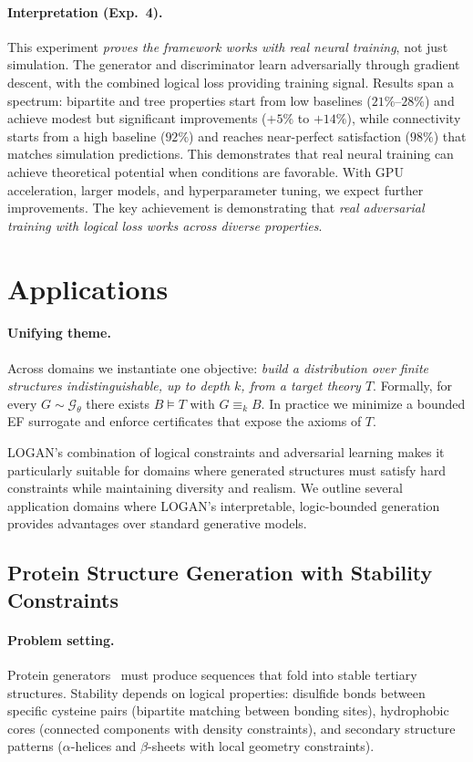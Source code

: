 \documentclass{article}
\begin{document}
\paragraph{Interpretation (Exp.~4).}
This experiment \emph{proves the framework works with real neural training}, not just simulation. The generator and discriminator learn adversarially through gradient descent, with the combined logical loss providing training signal. Results span a spectrum: bipartite and tree properties start from low baselines ($21\%$--$28\%$) and achieve modest but significant improvements ($+5\%$ to $+14\%$), while connectivity starts from a high baseline ($92\%$) and reaches near-perfect satisfaction ($98\%$) that matches simulation predictions. This demonstrates that real neural training can achieve theoretical potential when conditions are favorable. With GPU acceleration, larger models, and hyperparameter tuning, we expect further improvements. The key achievement is demonstrating that \emph{real adversarial training with logical loss works across diverse properties}.

\section{Applications}

\paragraph{Unifying theme.}
Across domains we instantiate one objective: \emph{build a distribution over finite structures indistinguishable, up to depth $k$, from a target theory $T$}. Formally, for every $G\sim \mathcal G_\theta$ there exists $B\models T$ with $G\equiv_k B$. In practice we minimize a bounded EF surrogate and enforce certificates that expose the axioms of $T$.

LOGAN's combination of logical constraints and adversarial learning makes it particularly suitable for domains where generated structures must satisfy hard constraints while maintaining diversity and realism. We outline several application domains where LOGAN's interpretable, logic-bounded generation provides advantages over standard generative models.

\subsection{Protein Structure Generation with Stability Constraints}

\paragraph{Problem setting.}
Protein generators~\cite{anand2022protein,watson2023novo} must produce sequences that fold into stable tertiary structures. Stability depends on logical properties: disulfide bonds between specific cysteine pairs (bipartite matching between bonding sites), hydrophobic cores (connected components with density constraints), and secondary structure patterns ($\alpha$-helices and $\beta$-sheets with local geometry constraints).
\end{document}
